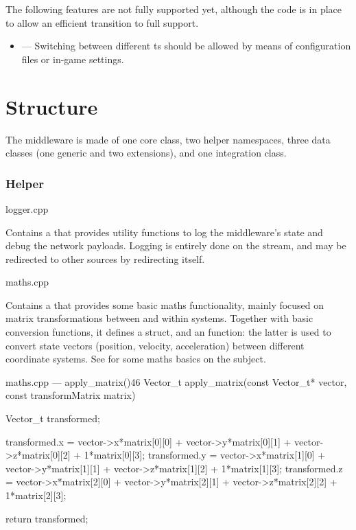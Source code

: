 \FLOATnoindent The following \glspl{feature} are not fully supported yet, although the code is in place to allow an efficient transition to full support.

\begin{itemize}
	\item {} --- Switching between different \gls{ts} should be allowed by means of configuration files or in-game settings.
\end{itemize}

\section{Structure}\label{sc:middleware:structure}

The \gls{middleware} is made of one core class, two helper namespaces, three data classes (one generic and two extensions), and one integration class.

\subsubsection{Helper}

\begin{filelist}
	\item logger.cpp
\end{filelist}

Contains a  that provides utility functions to log the \gls{middleware}'s state and debug the network payloads. Logging is entirely done on the  stream, and may be redirected to other sources by redirecting  itself.

\begin{filelist}
	\item maths.cpp
\end{filelist}

Contains a  that provides some basic maths functionality, mainly focused on matrix transformations between and within  systems. Together with basic conversion functions, it defines a  struct, and an  function: the latter is used to convert state vectors (position, velocity, acceleration) between different coordinate systems. See  for some maths basics on the subject.

\begin{codelist}{maths.cpp --- apply\_matrix()}{46}
Vector_t apply_matrix(const Vector_t* vector, const transformMatrix matrix) {
	Vector_t transformed;

	transformed.x = vector->x*matrix[0][0] + vector->y*matrix[0][1] + vector->z*matrix[0][2] + 1*matrix[0][3];
	transformed.y = vector->x*matrix[1][0] + vector->y*matrix[1][1] + vector->z*matrix[1][2] + 1*matrix[1][3];
	transformed.z = vector->x*matrix[2][0] + vector->y*matrix[2][1] + vector->z*matrix[2][2] + 1*matrix[2][3];

	return transformed;
}
\end{codelist}

